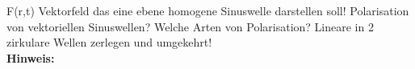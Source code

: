 \begin{question}[section=,subsection=,name={Vektorfeld einer homogenen Sinuswelle},difficulty=,type=mdl,tags={}]
	F(r,t) Vektorfeld das eine ebene homogene Sinuswelle darstellen soll!
	Polarisation von vektoriellen Sinuswellen?
	Welche Arten von Polarisation?
	Lineare in 2 zirkulare Wellen zerlegen und umgekehrt!
	\\ \textbf{Hinweis:}\\
	
\end{question}
\begin{solution}
	
\end{solution}